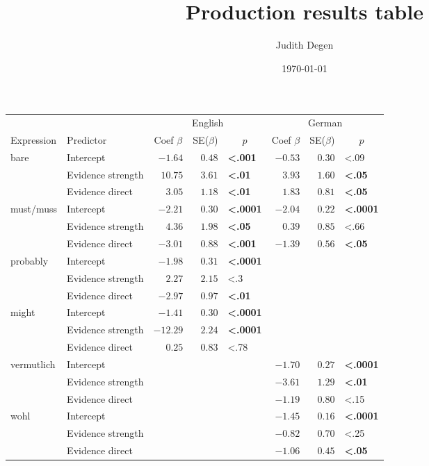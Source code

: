 \documentclass{article} %
\title{Production results table}
\author{%
Judith Degen}
\date{\today}
\begin{document}

\maketitle


\begin{table}[!tbp]
\begin{center}
\begin{tabular}{llrrlrrl}
\toprule
&   & \multicolumn{3}{c}{English} & \multicolumn{3}{c}{German}\\
Expression  & \multicolumn{1}{l}{Predictor}&\multicolumn{1}{c}{Coef $\beta$}&\multicolumn{1}{c}{SE($\beta$)}&\multicolumn{1}{c}{$p$}&\multicolumn{1}{c}{Coef $\beta$}&\multicolumn{1}{c}{SE($\beta$)}&\multicolumn{1}{c}{$p$}\tabularnewline
\midrule
\multirow{3}{*}{bare} & Intercept&$-1.64$&$0.48$&\textbf{\textless .001}&$-0.53$&$0.30$&\textless .09\tabularnewline
& Evidence strength&$10.75$&$3.61$&\textbf{\textless .01}&$ 3.93$&$1.60$&\textbf{\textless .05}\tabularnewline
& Evidence direct&$ 3.05$&$1.18$&\textbf{\textless .01}&$ 1.83$&$0.81$&\textbf{\textless .05}\tabularnewline
\midrule
\multirow{3}{*}{must/muss} & Intercept&$-2.21$&$0.30$&\textbf{\textless .0001}&$-2.04$&$0.22$&\textbf{\textless .0001}\tabularnewline
& Evidence strength&$ 4.36$&$1.98$&\textbf{\textless .05}&$ 0.39$&$0.85$&\textless .66\tabularnewline
& Evidence direct&$-3.01$&$0.88$&\textbf{\textless .001}&$-1.39$&$0.56$&\textbf{\textless .05}\tabularnewline
\midrule
\multirow{3}{*}{probably} & Intercept&$-1.98$&$0.31$&\textbf{\textless .0001}\tabularnewline
& Evidence strength&$ 2.27$&$2.15$&\textless .3\tabularnewline
& Evidence direct&$-2.97$&$0.97$&\textbf{\textless .01}\tabularnewline
\midrule
\multirow{3}{*}{might} & Intercept&$ -1.41$&$0.30$&\textbf{\textless .0001}\tabularnewline
& Evidence strength&$-12.29$&$2.24$&\textbf{\textless .0001}\tabularnewline
& Evidence direct&$  0.25$&$0.83$&\textless .78\tabularnewline
\midrule
\multirow{3}{*}{vermutlich} &Intercept&&&&$-1.70$&$0.27$&\textbf{\textless .0001}\tabularnewline
&Evidence strength&&&&$-3.61$&$1.29$&\textbf{\textless .01}\tabularnewline
&Evidence direct&&&&$-1.19$&$0.80$&\textless .15\tabularnewline
\midrule
\multirow{3}{*}{wohl} &Intercept&&&&$-1.45$&$0.16$&\textbf{\textless .0001}\tabularnewline
&Evidence strength&&&&$-0.82$&$0.70$&\textless .25\tabularnewline
&Evidence direct&&&&$-1.06$&$0.45$&\textbf{\textless .05}\tabularnewline
\bottomrule
\end{tabular}\end{center}
\end{table}
\end{document}
